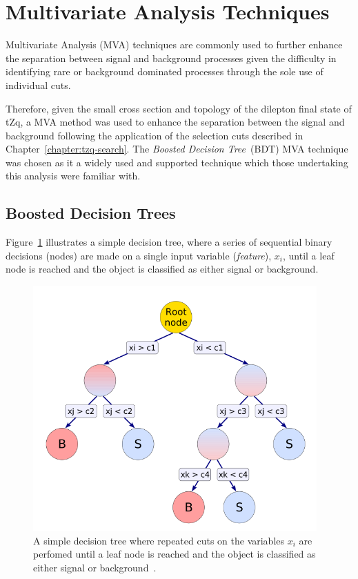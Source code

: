 \section{Multivariate Analysis Techniques}\label{sec:mvas}
Multivariate Analysis (MVA) techniques are commonly used to further enhance the separation between signal and background processes given the difficulty in identifying rare or background dominated processes through the sole use of individual cuts.

Therefore, given the small cross section and topology of the dilepton final state of tZq, a MVA method was used to enhance the separation between the signal and background following the application of the selection cuts described in Chapter~\ref{chapter:tzq-search}.
The \emph{Boosted Decision Tree}~(BDT) MVA technique was chosen as it a widely used and supported technique which those undertaking this analysis were familiar with.

\subsection{Boosted Decision Trees}\label{subsec:bdt}
Figure~\ref{fig:decisionTree} illustrates a simple decision tree, where a series of sequential binary decisions (nodes) are made on a single input variable (\emph{feature}), $x_{i}$, until a leaf node is reached and the object is classified as either signal or background.

\begin{figure}[htb]
\centering
\includegraphics[width=0.97\textwidth]{figs/background-estimation/decisionTree.pdf}
\caption{A simple decision tree where repeated cuts on the variables $x_{i}$ are perfomed until a leaf node is reached and the object is classified as either signal or background~\cite{Hocker:2007ht}.
}
\label{fig:decisionTree}
\end{figure}

